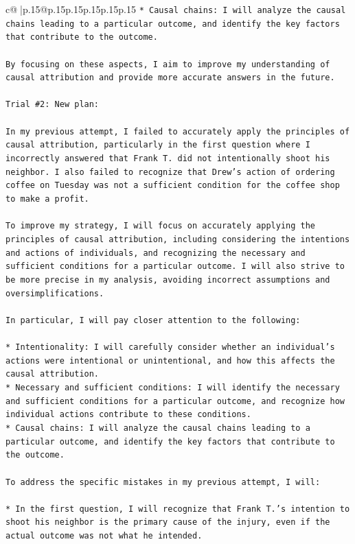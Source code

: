 \documentclass{article}
\begin{document}
{\begin{supertabular}{c@{$\;$}|p{.15\linewidth}@{}p{.15\linewidth}p{.15\linewidth}p{.15\linewidth}p{.15\linewidth}p{.15\linewidth}}
{{{\texttt{* Causal chains: I will analyze the causal chains leading to a particular outcome, and identify the key factors that contribute to the outcome.} \\
\\ 
\texttt{By focusing on these aspects, I aim to improve my understanding of causal attribution and provide more accurate answers in the future.} \\
\\ 
\texttt{Trial \#2: New plan: } \\
\\ 
\texttt{In my previous attempt, I failed to accurately apply the principles of causal attribution, particularly in the first question where I incorrectly answered that Frank T. did not intentionally shoot his neighbor. I also failed to recognize that Drew's action of ordering coffee on Tuesday was not a sufficient condition for the coffee shop to make a profit.} \\
\\ 
\texttt{To improve my strategy, I will focus on accurately applying the principles of causal attribution, including considering the intentions and actions of individuals, and recognizing the necessary and sufficient conditions for a particular outcome. I will also strive to be more precise in my analysis, avoiding incorrect assumptions and oversimplifications.} \\
\\ 
\texttt{In particular, I will pay closer attention to the following:} \\
\\ 
\texttt{* Intentionality: I will carefully consider whether an individual's actions were intentional or unintentional, and how this affects the causal attribution.} \\
\texttt{* Necessary and sufficient conditions: I will identify the necessary and sufficient conditions for a particular outcome, and recognize how individual actions contribute to these conditions.} \\
\texttt{* Causal chains: I will analyze the causal chains leading to a particular outcome, and identify the key factors that contribute to the outcome.} \\
\\ 
\texttt{To address the specific mistakes in my previous attempt, I will:} \\
\\ 
\texttt{* In the first question, I will recognize that Frank T.'s intention to shoot his neighbor is the primary cause of the injury, even if the actual outcome was not what he intended.} \\
}}}
\end{supertabular}}
\end{document}
